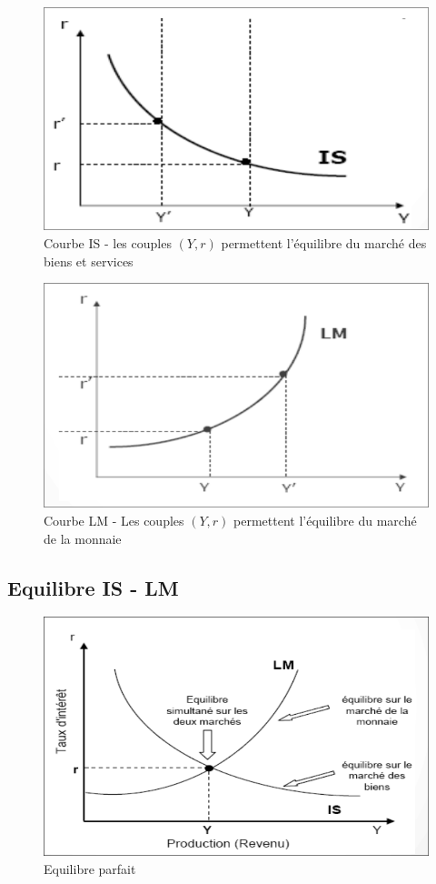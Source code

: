 \begin{center}
    \begin{figure}[hbt!]
        \includegraphics[scale=0.55]{Pics/Courbe_IS.png}
        \caption{Courbe IS - les couples $(Y,r)$ permettent l'équilibre du marché des biens et services}
    \end{figure}
    \begin{figure}[hbt!]
        \includegraphics[scale=0.6]{Pics/Courbe_LM.png}
        \caption{Courbe LM - Les couples $(Y,r)$ permettent l'équilibre du marché de la monnaie} 
    \end{figure}    
\end{center}
\newpage
\subsection{Equilibre IS - LM}
\begin{figure}[hbt!]
    \centering
    \includegraphics[scale=0.3]{Pics/Eq_IS_IM.png}
    \caption{Equilibre parfait}
\end{figure}

